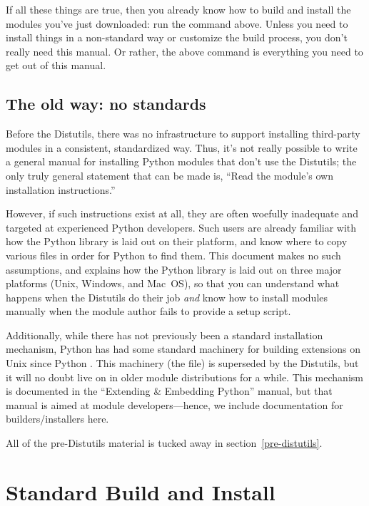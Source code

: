 \documentclass{howto}
\begin{document}
If all these things are true, then you already know how to build and
install the modules you've just downloaded: run the command above.
Unless you need to install things in a non-standard way or customize the
build process, you don't really need this manual.  Or rather, the above
command is everything you need to get out of this manual.


\subsection{The old way: no standards}
\label{old-way}

Before the Distutils, there was no infrastructure to support installing
third-party modules in a consistent, standardized way.  Thus, it's not
really possible to write a general manual for installing Python modules
that don't use the Distutils; the only truly general statement that can
be made is, ``Read the module's own installation instructions.''

However, if such instructions exist at all, they are often woefully
inadequate and targeted at experienced Python developers.  Such users
are already familiar with how the Python library is laid out on their
platform, and know where to copy various files in order for Python to
find them.  This document makes no such assumptions, and explains how
the Python library is laid out on three major platforms (Unix, Windows,
and Mac~OS), so that you can understand what happens when the Distutils
do their job \emph{and} know how to install modules manually when the
module author fails to provide a setup script.

Additionally, while there has not previously been a standard
installation mechanism, Python has had some standard machinery for
building extensions on Unix since Python .  This machinery
(the  file) is superseded by the Distutils, but it
will no doubt live on in older module distributions for a while.  This
 mechanism is documented in the ``Extending \&
Embedding Python'' manual, but that manual is aimed at module
developers---hence, we include documentation for builders/installers
here.

All of the pre-Distutils material is tucked away in
section~\ref{pre-distutils}.


\section{Standard Build and Install}
\label{normal-install}
\end{document}
